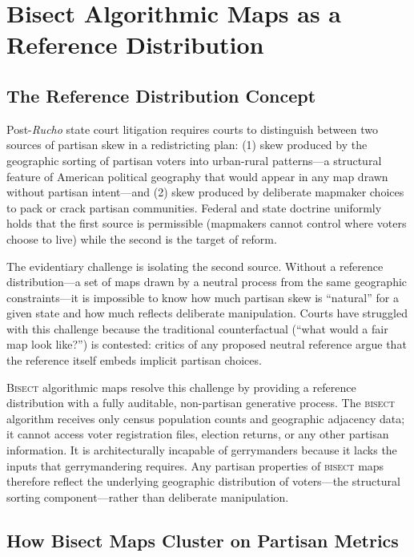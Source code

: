 \section{Bisect Algorithmic Maps as a Reference Distribution}
\label{sec:behavior}

\subsection{The Reference Distribution Concept}

Post-\textit{Rucho} state court litigation requires courts to distinguish between
two sources of partisan skew in a redistricting plan: (1) skew produced by the
geographic sorting of partisan voters into urban-rural patterns---a structural
feature of American political geography that would appear in any map drawn
without partisan intent---and (2) skew produced by deliberate mapmaker choices
to pack or crack partisan communities. Federal and state doctrine uniformly holds
that the first source is permissible (mapmakers cannot control where voters
choose to live) while the second is the target of reform.

The evidentiary challenge is isolating the second source. Without a reference
distribution---a set of maps drawn by a neutral process from the same geographic
constraints---it is impossible to know how much partisan skew is ``natural'' for
a given state and how much reflects deliberate manipulation. Courts have struggled
with this challenge because the traditional counterfactual (``what would a fair
map look like?'') is contested: critics of any proposed neutral reference argue
that the reference itself embeds implicit partisan choices.

\textsc{Bisect} algorithmic maps resolve this challenge by providing a reference
distribution with a fully auditable, non-partisan generative process. The
\textsc{bisect} algorithm receives only census population counts and geographic
adjacency data; it cannot access voter registration files, election returns, or
any other partisan information. It is architecturally incapable of gerrymanders
because it lacks the inputs that gerrymandering requires. Any partisan properties
of \textsc{bisect} maps therefore reflect the underlying geographic distribution
of voters---the structural sorting component---rather than deliberate manipulation.

\subsection{How Bisect Maps Cluster on Partisan Metrics}

